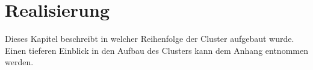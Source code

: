 \newpage
\section{Realisierung} 
\label{sec:Realisierung}
Dieses Kapitel beschreibt in welcher Reihenfolge der Cluster  aufgebaut wurde. Einen tieferen Einblick in den Aufbau des Clusters kann dem Anhang entnommen werden.


